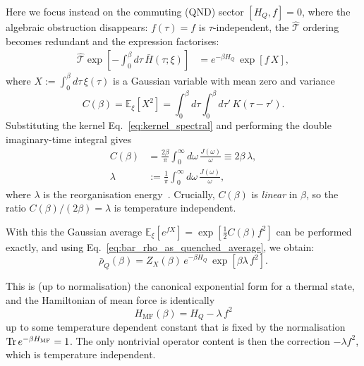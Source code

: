 Here we focus instead on the commuting (QND) sector $[H_Q,f]=0$, where the algebraic obstruction disappears: $f(\tau)=f$ is $\tau$-independent, the $\hat{\mathcal{T}}$ ordering becomes redundant and the expression factorises:
\begin{align}
    \hat{\mathcal{T}}\exp\!\left[-\int_0^\beta d\tau\,\bar{H}(\tau;\xi)\right]
    &=
    e^{-\beta H_Q}\, \exp\!\left[f\,X\right],
    \label{eq:tilde_rho_commuting_factorised}
\end{align}
where $X:=\int_0^\beta d\tau\,\xi(\tau)$ is a Gaussian variable with mean zero and variance
\begin{equation}
    C(\beta) = \mathbb E_\xi[X^2] = \int_0^\beta d\tau\int_0^\beta d\tau'\,K(\tau-\tau').
    \label{eq:Cbeta_def}
\end{equation}
Substituting the kernel Eq.~\eqref{eq:kernel_spectral} and performing the double
imaginary-time integral gives
\begin{align}
    C(\beta)
    &=\frac{2\beta}{\pi}\int_0^\infty d\omega\,\frac{J(\omega)}{\omega}
    \equiv 2\beta\,\lambda,
    \nonumber\\
    \lambda&:=\frac{1}{\pi}\int_0^\infty d\omega\,\frac{J(\omega)}{\omega},
    \label{eq:Cbeta_explicit}
\end{align}
where $\lambda$ is the reorganisation energy~\cite{weissQuantumDissipativeSystems2012, leggettDynamicsDissipativeTwostate1987}.
Crucially, $C(\beta)$ is \emph{linear} in $\beta$, so the ratio $C(\beta)/(2\beta)=\lambda$ is temperature independent.

With this the Gaussian average $\mathbb E_\xi[e^{f X}] = \exp[\frac{1}{2}C(\beta)f^2]$ can be performed exactly, and using Eq.~\eqref{eq:bar_rho_as_quenched_average}, we obtain:
\begin{equation}
    \bar\rho_Q(\beta) = Z_X(\beta)\,e^{-\beta H_Q}\,\exp\!\left[\beta\lambda\,f^2\right].
    \label{eq:bar_rho_commuting_closed}
\end{equation}

This is (up to normalisation) the canonical exponential form for a thermal state, and the Hamiltonian of mean force is identically
\begin{equation}
    H_{\mathrm{MF}}(\beta) = H_Q -\lambda\,f^2 
    \label{eq:HMF_commuting_final}
\end{equation}
up to some temperature dependent constant that is fixed by the normalisation
$\mathrm{Tr}\,e^{-\beta H_{\mathrm{MF}}}=1$. The only nontrivial operator content is then the correction $-\lambda f^2$, which is temperature independent.

